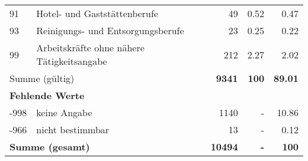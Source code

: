 \begin{longtable}{lXrrr}
        91 & \multicolumn{1}{X}{Hotel- und Gaststättenberufe} & %
          \num{49} &
          \num[round-mode=places,round-precision=2]{0.52} &
          \num[round-mode=places,round-precision=2]{0.47} \\

        93 & \multicolumn{1}{X}{Reinigungs- und Entsorgungsberufe} & %
          \num{23} &
          \num[round-mode=places,round-precision=2]{0.25} &
          \num[round-mode=places,round-precision=2]{0.22} \\

        99 & \multicolumn{1}{X}{Arbeitskräfte ohne nähere Tätigkeitsangabe} & %
          \num{212} &
          \num[round-mode=places,round-precision=2]{2.27} &
          \num[round-mode=places,round-precision=2]{2.02} \\

     \midrule
     \multicolumn{2}{l}{Summe (gültig)} &
       \textbf{\num{9341}} &
     \textbf{\num{100}} &
       \textbf{\num[round-mode=places,round-precision=2]{89.01}} \\
     \multicolumn{5}{l}{\textbf{Fehlende Werte}}\\
       -998 &
       keine Angabe &
         \num{1140} &
        - &
         \num[round-mode=places,round-precision=2]{10.86} \\
       -966 &
       nicht bestimmbar &
         \num{13} &
        - &
         \num[round-mode=places,round-precision=2]{0.12} \\
     \midrule
     \multicolumn{2}{l}{\textbf{Summe (gesamt)}} &
          \textbf{\num{10494}} &
        \textbf{-} &
        \textbf{\num{100}} \\
     \bottomrule
     \end{longtable}
     
